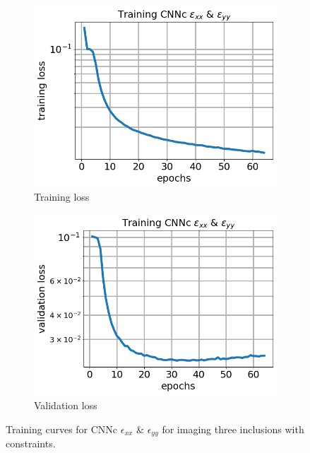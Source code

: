\documentclass[12pt]{article}
\newcommand{\nhgfigheight}{4.0cm}
\begin{document}
%
\begin{figure}[h]
  \centering
  \begin{subfigure}[b]{0.45\linewidth}
    \includegraphics[totalheight=\nhgfigheight]{Figures/final3c/training/exxeyy/field_strainxxyy_plot_loss.png}
    \caption{Training loss}
  \end{subfigure}
  \begin{subfigure}[b]{0.45\linewidth}
    \includegraphics[totalheight=\nhgfigheight]{Figures/final3c/training/exxeyy/field_strainxxyy_plot_val_loss.png}
    \caption{Validation loss}
  \end{subfigure}
\caption{\label{fig:threeinctanh:trainexxeyy} Training curves for CNNc $\epsilon_{xx}$ \& $\epsilon_{yy}$ for imaging three inclusions with constraints.}
\end{figure}
\end{document}
